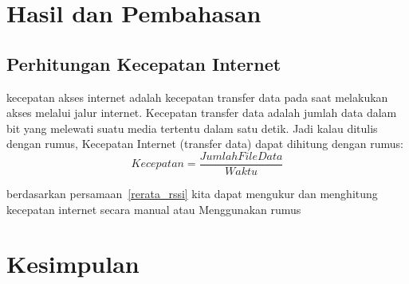 \documentclass[conference]{IEEEtran}
\begin{document}
\section{Hasil dan Pembahasan}
\subsection{Perhitungan Kecepatan Internet}
kecepatan akses internet adalah kecepatan transfer data pada saat melakukan akses melalui jalur internet. Kecepatan transfer data adalah jumlah data dalam bit yang melewati suatu media tertentu dalam satu detik.
Jadi kalau ditulis dengan rumus, Kecepatan Internet (transfer data) dapat dihitung dengan rumus:
\begin{equation}
    Kecepatan = \frac{Jumlah File Data}{Waktu}
    \label{rerata_rssi}
\end{equation}

berdasarkan persamaan~\ref{rerata_rssi} kita dapat mengukur dan menghitung 
kecepatan internet secara manual atau Menggunakan rumus 


\section{Kesimpulan}



\end{document}
